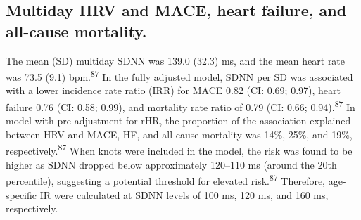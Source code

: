 \documentclass[
  a4paper,
  headsepline=true,
  open=left]{scrbook}
\begin{document}
\restoregeometry

\hypertarget{multiday-hrv-and-mace-heart-failure-and-all-cause-mortality.}{%
\subsection{Multiday HRV and MACE, heart failure, and all-cause
mortality.}\label{multiday-hrv-and-mace-heart-failure-and-all-cause-mortality.}}

The mean (SD) multiday SDNN was 139.0 (32.3) ms, and the mean heart rate
was 73.5 (9.1) bpm.\textsuperscript{87} In the fully adjusted model,
SDNN per SD was associated with a lower incidence rate ratio (IRR) for
MACE 0.82 (CI: 0.69; 0.97), heart failure 0.76 (CI: 0.58; 0.99), and
mortality rate ratio of 0.79 (CI: 0.66; 0.94).\textsuperscript{87} In
model with pre-adjustment for rHR, the proportion of the association
explained between HRV and MACE, HF, and all-cause mortality was 14\%,
25\%, and 19\%, respectively.\textsuperscript{87} When knots were
included in the model, the risk was found to be higher as SDNN dropped
below approximately 120--110 ms (around the 20th percentile), suggesting
a potential threshold for elevated risk.\textsuperscript{87} Therefore,
age-specific IR were calculated at SDNN levels of 100 ms, 120 ms, and
160 ms, respectively.

\end{document}
